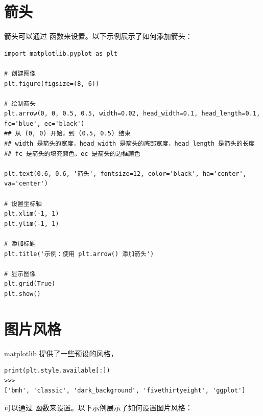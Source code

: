 \section{箭头}
箭头可以通过  函数来设置。以下示例展示了如何添加箭头：

\begin{lstlisting}[style=pythonstyle]
import matplotlib.pyplot as plt

# 创建图像
plt.figure(figsize=(8, 6))

# 绘制箭头
plt.arrow(0, 0, 0.5, 0.5, width=0.02, head_width=0.1, head_length=0.1, fc='blue', ec='black')
## 从 (0, 0) 开始，到 (0.5, 0.5) 结束
## width 是箭头的宽度，head_width 是箭头的底部宽度，head_length 是箭头的长度
## fc 是箭头的填充颜色，ec 是箭头的边框颜色

plt.text(0.6, 0.6, '箭头', fontsize=12, color='black', ha='center', va='center')

# 设置坐标轴
plt.xlim(-1, 1)
plt.ylim(-1, 1)

# 添加标题
plt.title('示例：使用 plt.arrow() 添加箭头')

# 显示图像
plt.grid(True)
plt.show()
\end{lstlisting}    


\section{图片风格}
matplotlib 提供了一些预设的风格，
\begin{lstlisting}[style=demostyle, numbers=none]
print(plt.style.available[:])
>>>
['bmh', 'classic', 'dark_background', 'fivethirtyeight', 'ggplot']
\end{lstlisting}

可以通过  函数来设置。以下示例展示了如何设置图片风格：

